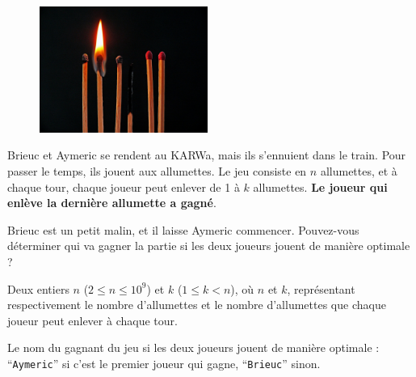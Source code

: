 \problemname{\problemyamlname}


\begin{figure}
	\centering
	\includegraphics[width=5.5cm]{allumettes.jpg}
\end{figure}
Brieuc et Aymeric se rendent au KARWa, mais ils s'ennuient dans le train. Pour passer le temps, ils jouent aux allumettes. Le jeu consiste en $n$ allumettes,
et à chaque tour, chaque joueur peut enlever de 1 à $k$ allumettes. \textbf{Le joueur qui enlève la dernière allumette a gagné}.

Brieuc est un petit malin, et il laisse Aymeric commencer. Pouvez-vous déterminer qui va gagner la partie si les deux joueurs jouent de manière optimale ?

\begin{Input}
	Deux entiers $n$ ($2 \le n \le 10^9$) et $k$ ($1 \le k < n$), où $n$ et $k$, représentant respectivement le nombre d'allumettes et le nombre d'allumettes que chaque joueur peut enlever à chaque tour.
\end{Input}

\begin{Output}
	Le nom du gagnant du jeu si les deux joueurs jouent de manière optimale : ``\verb|Aymeric|'' si c'est le premier joueur qui gagne, ``\verb|Brieuc|'' sinon.
\end{Output}
